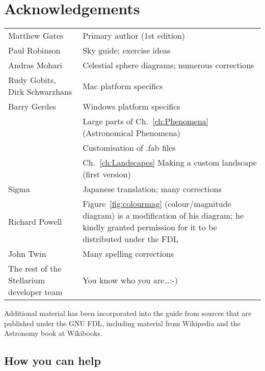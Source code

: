 
\chapter{Acknowledgements}

\begin{longtabu} to \textwidth {l|X}
\toprule
Matthew Gates & Primary author (1st edition)\\
Paul Robinson &Sky guide; exercise ideas\\
Andras Mohari &Celestial sphere diagrams; numerous corrections\\
Rudy Gobits, Dirk Schwarzhans & Mac platform specifics\\
Barry Gerdes&Windows platform specifics \\
            &Large parts of Ch.~\ref{ch:Phenomena} (Astronomical Phenomena)\\
            &Customisation of .fab files\\
            &Ch.~\ref{ch:Landscapes} Making a custom landscape (first version) \\
Sigma       &Japanese translation; many corrections\\ %
Richard Powell& Figure~\ref{fig:colourmag} (colour/magnitude diagram) is a modification of his diagram; he kindly granted permission for it to be distributed under the FDL\\


John Twin & Many spelling corrections \\
The rest of the Stellarium developer team & You know who you are\ldots :-)\tabularnewline
\bottomrule
\end{longtabu}


Additional material has been incorporated into the guide from sources
that are published under the GNU FDL, including material from Wikipedia
and the Astronomy book at Wikibooks.

\section{How you can help}
\label{sec:HowYouCanHelp}

